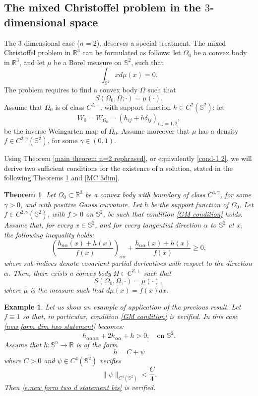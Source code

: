 \documentclass[12pt]{amsart}
\newtheorem{thm}{Theorem}[section]
\newtheorem{example}[theorem]{Example}
\newcommand{\R}{\mathbb R}
\newcommand{\1}{\mathbf 1}
\newcommand{\s}{\mathbb S}
\newcommand{\sfe}{{{\mathbb S}^{n}}}
\begin{document}
\subsection{The mixed Christoffel problem in the $3$-dimensional space}\label{Mp2} The $3$-dimensional case ($n=2$), deserves a special treatment. The mixed Christoffel problem in $\R^3$ can be formulated as follows: let $\Omega_0$ be a convex body in $\R^3$, and let $\mu$ be a Borel measure on $\s^2$, such that
$$
\int_{\s^2}xd\mu(x)=0.
$$
The problem requires to find a convex body $\Omega$ such that
$$
S(\Omega_0,\Omega;\cdot)=\mu(\cdot).
$$
Assume that $\Omega_0$ is of class $C^{2,+}$, with support function $h\in C^2(\s^2)$; let 
$$
W_0=W_{\Omega_0}=(h_{ij}+h\delta_{ij})_{i,j=1,2},
$$
be the inverse Weingarten map of $\Omega_0$. Assume moreover that $\mu$ has a density $f\in C^{2,\gamma}(\s^2)$, for some $\gamma\in(0,1)$. 

Using Theorem \ref{main theorem n=2 rephrased}, or equivalently \eqref{cond-1 2}, we will derive two sufficient conditions for the existence of a solution, stated in the following Theorems \ref{MC 3dim 1} and \ref{MC 3dim}.  

\begin{thm}\label{MC 3dim 1} Let $\Omega_0\subset\R^3$ be a convex body with boundary of class $C^{4,\gamma}$, for some $\gamma>0$, and with positive Gauss curvature. Let $h$ be the support function of $\Omega_0$. Let $f\in C^{2,\gamma}(\s^2)$, with $f>0$ on $\s^2$, be such that condition \eqref{GM condition} holds. Assume that, for every $x\in\s^2$, and for every tangential direction $\alpha$ to $\s^2$ at $x$, the following inequality holds: 
\begin{equation}\label{new form dim two statement}
\left(\frac{h_{\alpha\alpha}(x)+h(x)}{f(x)}\right)_{\alpha\alpha}+\frac{h_{\alpha\alpha}(x)+h(x)}{f(x)}\ge0,
\end{equation}
where sub-indices denote covariant partial derivatives with respect to the direction $\alpha$. Then, there exists a convex body $\Omega\in C^{2,+}$ such that
$$
S(\Omega_0,\Omega,\cdot)=\mu(\cdot)\,,
$$
where $\mu$ is the measure such that $d\mu(x)=f(x)dx$.
\end{thm}

\begin{example} Let us show an example of application of the previous result. Let $f\equiv1$ so that, in particular, condition \eqref{GM condition} is verified. In this case \eqref{new form dim two statement} becomes:
\begin{equation}\label{e:new form two d statement bis}
h_{\alpha\alpha\alpha\alpha}+2h_{\alpha\alpha}+h>0, \quad\mbox{on $\s^2$.}
\end{equation}
Assume that $h\colon\sfe\to\R$ is of the form
$$
h=C+\psi
$$
where $C>0$ and $\psi\in C^4(\s^2)$ verifies
$$
\|\psi\|_{C^4(\s^2)}<\frac C4.
$$
Then \eqref{e:new form two d statement bis} is verified. 
\end{example}
\end{document}
